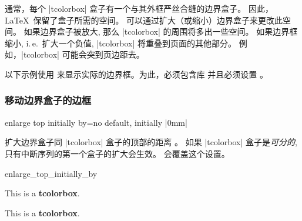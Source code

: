 通常，每个 |tcolorbox| 盒子有一个与其外框严丝合缝的边界盒子。%
因此，\LaTeX\ 保留了盒子所需的空间。%
可以通过扩大（或缩小）边界盒子来更改此空间。%
如果边界盒子被放大, 那么 |tcolorbox| 的周围将多出一些空间。 如果边界框缩小, i.\,e.\ 扩大一个负值, |tcolorbox| 将重叠到页面的其他部分。%
例如，|tcolorbox| 可能会突到页边距去。

\begin{marker}

以下示例使用  来显示实际的边界框。为此，必须包含库  并且必须设置 。
\end{marker}


\subsubsection{移动边界盒子的边框}

\begin{docTcbKey}{enlarge top initially by}{=}{no default, initially |0mm|}

扩大边界盒子同 |tcolorbox| 盒子的顶部的距离 。
如果 |tcolorbox| 盒子是\emph{可分的}, 只有中断序列的第一个盒子的扩大会生效。 
 会覆盖这个设置。
\begin{exdispExample}{enlarge_top_initially_by}

\begin{tcolorbox}[enlarge top initially by=-5mm]
This is a \textbf{tcolorbox}.
\end{tcolorbox}
\begin{tcolorbox}[enlarge top initially by=5mm,enhanced,show bounding box]
This is a \textbf{tcolorbox}.
\end{tcolorbox}
\end{exdispExample}
\end{docTcbKey}





